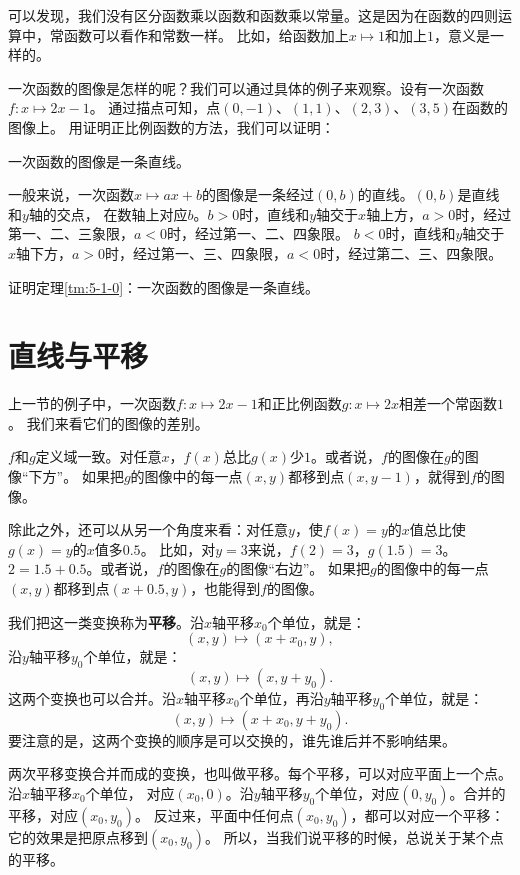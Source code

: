 \documentclass[12pt,UTF8,fontset=none]{ctexbook}
\begin{document}
可以发现，我们没有区分函数乘以函数和函数乘以常量。这是因为在函数的四则运算中，常函数可以看作和常数一样。
比如，给函数加上$x\mapsto 1$和加上$1$，意义是一样的。

一次函数的图像是怎样的呢？我们可以通过具体的例子来观察。设有一次函数$f: x\mapsto 2x - 1$。
通过描点可知，点$(0, -1)$、$(1, 1)$、$(2, 3)$、$(3, 5)$在函数的图像上。
用证明正比例函数的方法，我们可以证明：

\begin{tm}\label{tm:5-1-0}
    一次函数的图像是一条直线。
\end{tm}

一般来说，一次函数$x\mapsto ax + b$的图像是一条经过$(0, b)$的直线。$(0, b)$是直线和$y$轴的交点，
在数轴上对应$b$。$b>0$时，直线和$y$轴交于$x$轴上方，$a>0$时，经过第一、二、三象限，$a<0$时，经过第一、二、四象限。
$b<0$时，直线和$y$轴交于$x$轴下方，$a>0$时，经过第一、三、四象限，$a<0$时，经过第二、三、四象限。

\begin{xt}
    证明定理\ref{tm:5-1-0}：一次函数的图像是一条直线。
\end{xt}

\section{直线与平移}
上一节的例子中，一次函数$f: x\mapsto 2x - 1$和正比例函数$g: x\mapsto 2x$相差一个常函数$1$。
我们来看它们的图像的差别。

$f$和$g$定义域一致。对任意$x$，$f(x)$总比$g(x)$少$1$。或者说，$f$的图像在$g$的图像“下方”。
如果把$g$的图像中的每一点$(x, y)$都移到点$(x, y-1)$，就得到$f$的图像。

除此之外，还可以从另一个角度来看：对任意$y$，使$f(x)=y$的$x$值总比使$g(x)=y$的$x$值多$0.5$。
比如，对$y=3$来说，$f(2)=3$，$g(1.5)=3$。$2=1.5+0.5$。或者说，$f$的图像在$g$的图像“右边”。
如果把$g$的图像中的每一点$(x, y)$都移到点$(x+0.5, y)$，也能得到$f$的图像。

我们把这一类变换称为\textbf{平移}。沿$x$轴平移$x_0$个单位，就是：
$$ (x, y) \mapsto (x+x_0, y),$$
沿$y$轴平移$y_0$个单位，就是：
$$ (x, y) \mapsto (x, y+y_0).$$
这两个变换也可以合并。沿$x$轴平移$x_0$个单位，再沿$y$轴平移$y_0$个单位，就是：
$$ (x, y) \mapsto (x+x_0, y+y_0).$$
要注意的是，这两个变换的顺序是可以交换的，谁先谁后并不影响结果。

两次平移变换合并而成的变换，也叫做平移。每个平移，可以对应平面上一个点。沿$x$轴平移$x_0$个单位，
对应$(x_0, 0)$。沿$y$轴平移$y_0$个单位，对应$(0, y_0)$。合并的平移，对应$(x_0, y_0)$。
反过来，平面中任何点$(x_0, y_0)$，都可以对应一个平移：它的效果是把原点移到$(x_0, y_0)$。
所以，当我们说平移的时候，总说关于某个点的平移。
\end{document}
